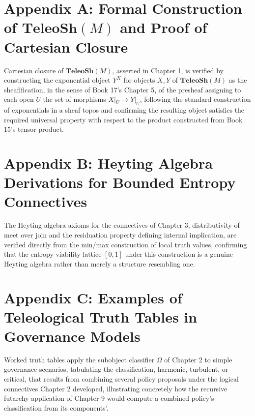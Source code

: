 \chapter*{Appendix A: Formal Construction of $\mathbf{TeleoSh}(M)$ and Proof of Cartesian Closure}

Cartesian closure of $\mathbf{TeleoSh}(M)$, asserted in Chapter 1, is verified by constructing the exponential object $Y^X$ for objects $X, Y$ of $\mathbf{TeleoSh}(M)$ as the sheafification, in the sense of Book 17's Chapter 5, of the presheaf assigning to each open $U$ the set of morphisms $X|_U \to Y|_U$, following the standard construction of exponentials in a sheaf topos and confirming the resulting object satisfies the required universal property with respect to the product constructed from Book 15's tensor product.

\chapter*{Appendix B: Heyting Algebra Derivations for Bounded Entropy Connectives}

The Heyting algebra axioms for the connectives of Chapter 3, distributivity of meet over join and the residuation property defining internal implication, are verified directly from the min/max construction of local truth values, confirming that the entropy-viability lattice $[0,1]$ under this construction is a genuine Heyting algebra rather than merely a structure resembling one.

\chapter*{Appendix C: Examples of Teleological Truth Tables in Governance Models}

Worked truth tables apply the subobject classifier $\Omega$ of Chapter 2 to simple governance scenarios, tabulating the classification, harmonic, turbulent, or critical, that results from combining several policy proposals under the logical connectives Chapter 2 developed, illustrating concretely how the recursive futarchy application of Chapter 9 would compute a combined policy's classification from its components'.

